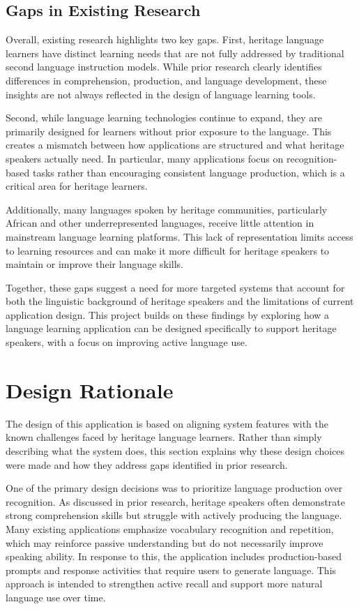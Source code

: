 \documentclass[12pt]{article}
\begin{document}
\subsection{Gaps in Existing Research}

Overall, existing research highlights two key gaps. First, heritage language learners have distinct learning needs that are not fully addressed by traditional second language instruction models. While prior research clearly identifies differences in comprehension, production, and language development, these insights are not always reflected in the design of language learning tools.

Second, while language learning technologies continue to expand, they are primarily designed for learners without prior exposure to the language. This creates a mismatch between how applications are structured and what heritage speakers actually need. In particular, many applications focus on recognition-based tasks rather than encouraging consistent language production, which is a critical area for heritage learners.

Additionally, many languages spoken by heritage communities, particularly African and other underrepresented languages, receive little attention in mainstream language learning platforms. This lack of representation limits access to learning resources and can make it more difficult for heritage speakers to maintain or improve their language skills.

Together, these gaps suggest a need for more targeted systems that account for both the linguistic background of heritage speakers and the limitations of current application design. This project builds on these findings by exploring how a language learning application can be designed specifically to support heritage speakers, with a focus on improving active language use.
\section{Design Rationale}

The design of this application is based on aligning system features with the known challenges faced by heritage language learners. Rather than simply describing what the system does, this section explains why these design choices were made and how they address gaps identified in prior research.

One of the primary design decisions was to prioritize language production over recognition. As discussed in prior research, heritage speakers often demonstrate strong comprehension skills but struggle with actively producing the language. Many existing applications emphasize vocabulary recognition and repetition, which may reinforce passive understanding but do not necessarily improve speaking ability. In response to this, the application includes production-based prompts and response activities that require users to generate language. This approach is intended to strengthen active recall and support more natural language use over time.
\end{document}
